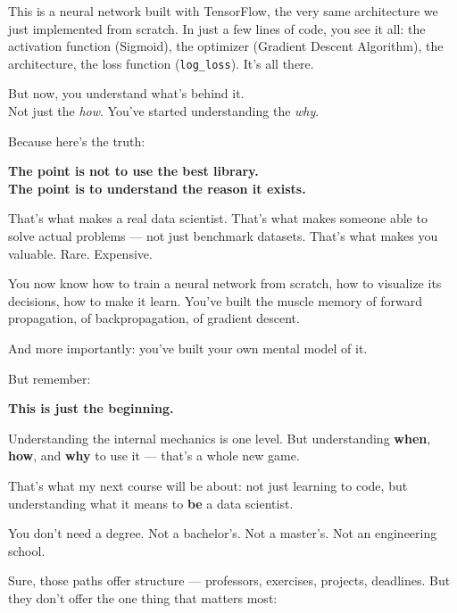 \documentclass[11pt]{article}
\begin{document}
\noindent
This is a neural network built with TensorFlow, the very same architecture we just implemented from scratch.
\bigskip
\noindent
In just a few lines of code, you see it all: the activation function (Sigmoid), the optimizer (Gradient Descent Algorithm), the architecture, the loss function (\texttt{log\_loss}). It’s all there.

But now, you understand what's behind it.\\
Not just the \emph{how}. You’ve started understanding the \emph{why}.

\bigskip

\noindent
Because here’s the truth:

\begin{center}
\textbf{The point is not to use the best library.}\\
\textbf{The point is to understand the reason it exists.}
\end{center}

\medskip

That’s what makes a real data scientist. That’s what makes someone able to solve actual problems — not just benchmark datasets. That’s what makes you valuable. Rare. Expensive.

\medskip

You now know how to train a neural network from scratch, how to visualize its decisions, how to make it learn. You’ve built the muscle memory of forward propagation, of backpropagation, of gradient descent.

And more importantly: you’ve built your own mental model of it.

\bigskip

But remember:

\begin{center}
\textbf{This is just the beginning.}
\end{center}

\medskip

Understanding the internal mechanics is one level. But understanding \textbf{when}, \textbf{how}, and \textbf{why} to use it — that’s a whole new game.

That’s what my next course will be about: not just learning to code, but understanding what it means to \textbf{be} a data scientist.

\bigskip

You don’t need a degree. Not a bachelor's. Not a master's. Not an engineering school.

Sure, those paths offer structure — professors, exercises, projects, deadlines. But they don’t offer the one thing that matters most:
\end{document}
